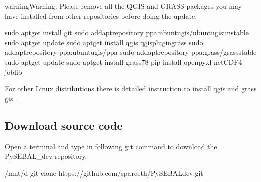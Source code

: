 \documentclass[letterpaper,10pt,english]{sphinxmanual}
\begin{document}
\begin{sphinxadmonition}{warning}{Warning:}
Please remove all the QGIS and GRASS packages you may have installed from other repositories before doing the update.
\end{sphinxadmonition}

\begin{sphinxVerbatim}[commandchars=\\\{\},numbers=left,firstnumber=1,stepnumber=1]
sudo apt\PYGZhy{}get install git
sudo add\PYGZhy{}apt\PYGZhy{}repository ppa:ubuntugis/ubuntugis\PYGZhy{}unstable
sudo apt\PYGZhy{}get update
sudo apt\PYGZhy{}get install qgis qgis\PYGZhy{}plugin\PYGZhy{}grass
sudo add\PYGZhy{}apt\PYGZhy{}repository ppa:ubuntugis/ppa
sudo add\PYGZhy{}apt\PYGZhy{}repository ppa:grass/grass\PYGZhy{}stable
sudo apt\PYGZhy{}get update
sudo apt\PYGZhy{}get install grass78
pip install openpyxl netCDF4 joblib
\end{sphinxVerbatim}

For other Linux distributions there is detailed instruction to install qgis  and grass gis .


\subsection{Download source code}
\label{\detokenize{installation:download-source-code}}
Open a terminal and type in following git command to download the PySEBAL\_dev repository.

\begin{sphinxVerbatim}[commandchars=\\\{\},numbers=left,firstnumber=1,stepnumber=1]
 /mnt/d
git clone https://github.com/spareeth/PySEBAL\PYGZus{}dev.git
\end{sphinxVerbatim}
\end{document}
